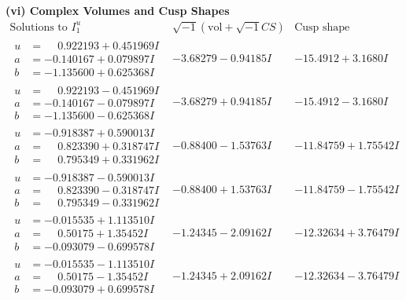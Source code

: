 \documentclass[1p]{elsarticle_modified}
\theoremstyle{definition}
\newcommand{\I}{\sqrt{-1}}
\begin{document}
\newpage\flushleft \textbf{(vi) Complex Volumes and Cusp Shapes}
$$\begin{array}{c|c|c}  
\text{Solutions to }I^u_{1}& \I (\text{vol} + \sqrt{-1}CS) & \text{Cusp shape}\\
 \hline 
\begin{aligned}
u &= \phantom{-}0.922193 + 0.451969 I \\
a &= -0.140167 + 0.079897 I \\
b &= -1.135600 + 0.625368 I\end{aligned}
 & -3.68279 - 0.94185 I & -15.4912 + 3.1680 I \\ \hline\begin{aligned}
u &= \phantom{-}0.922193 - 0.451969 I \\
a &= -0.140167 - 0.079897 I \\
b &= -1.135600 - 0.625368 I\end{aligned}
 & -3.68279 + 0.94185 I & -15.4912 - 3.1680 I \\ \hline\begin{aligned}
u &= -0.918387 + 0.590013 I \\
a &= \phantom{-}0.823390 + 0.318747 I \\
b &= \phantom{-}0.795349 + 0.331962 I\end{aligned}
 & -0.88400 - 1.53763 I & -11.84759 + 1.75542 I \\ \hline\begin{aligned}
u &= -0.918387 - 0.590013 I \\
a &= \phantom{-}0.823390 - 0.318747 I \\
b &= \phantom{-}0.795349 - 0.331962 I\end{aligned}
 & -0.88400 + 1.53763 I & -11.84759 - 1.75542 I \\ \hline\begin{aligned}
u &= -0.015535 + 1.113510 I \\
a &= \phantom{-}0.50175 + 1.35452 I \\
b &= -0.093079 - 0.699578 I\end{aligned}
 & -1.24345 - 2.09162 I & -12.32634 + 3.76479 I \\ \hline\begin{aligned}
u &= -0.015535 - 1.113510 I \\
a &= \phantom{-}0.50175 - 1.35452 I \\
b &= -0.093079 + 0.699578 I\end{aligned}
 & -1.24345 + 2.09162 I & -12.32634 - 3.76479 I \\ \hline\begin{aligned}

\end{aligned}
\end{array}$$
\end{document}
